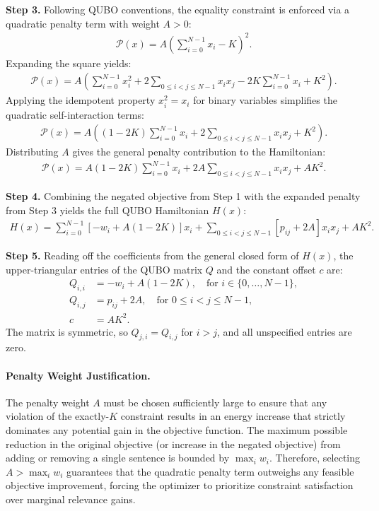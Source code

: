 \documentclass[12pt]{article}
\begin{document}
\textbf{Step 3.} Following QUBO conventions, the equality constraint is enforced via a quadratic penalty term with weight $A > 0$:
\begin{align}
    \mathcal{P}(x) = A \left( \sum_{i=0}^{N-1} x_i - K \right)^2.
\end{align}
Expanding the square yields:
\begin{align}
    \mathcal{P}(x) = A \left( \sum_{i=0}^{N-1} x_i^2 + 2 \sum_{0 \leq i < j \leq N-1} x_i x_j - 2K \sum_{i=0}^{N-1} x_i + K^2 \right).
\end{align}
Applying the idempotent property $x_i^2 = x_i$ for binary variables simplifies the quadratic self-interaction terms:
\begin{align}
    \mathcal{P}(x) = A \left( (1 - 2K) \sum_{i=0}^{N-1} x_i + 2 \sum_{0 \leq i < j \leq N-1} x_i x_j + K^2 \right).
\end{align}
Distributing $A$ gives the general penalty contribution to the Hamiltonian:
\begin{align}
    \mathcal{P}(x) = A(1 - 2K) \sum_{i=0}^{N-1} x_i + 2A \sum_{0 \leq i < j \leq N-1} x_i x_j + A K^2.
\end{align}

\textbf{Step 4.} Combining the negated objective from Step 1 with the expanded penalty from Step 3 yields the full QUBO Hamiltonian $H(x)$:
\begin{align}
    H(x) = \sum_{i=0}^{N-1} \left[ -w_i + A(1 - 2K) \right] x_i + \sum_{0 \leq i < j \leq N-1} \left[ p_{ij} + 2A \right] x_i x_j + A K^2.
\end{align}

\textbf{Step 5.} Reading off the coefficients from the general closed form of $H(x)$, the upper-triangular entries of the QUBO matrix $Q$ and the constant offset $c$ are:
\begin{align}
    Q_{i,i} &= -w_i + A(1 - 2K), \quad \text{for } i \in \{0, \dots, N-1\}, \\
    Q_{i,j} &= p_{ij} + 2A, \quad \text{for } 0 \leq i < j \leq N-1, \\
    c &= A K^2.
\end{align}
The matrix is symmetric, so $Q_{j,i} = Q_{i,j}$ for $i > j$, and all unspecified entries are zero.

\paragraph{Penalty Weight Justification.}
The penalty weight $A$ must be chosen sufficiently large to ensure that any violation of the exactly-$K$ constraint results in an energy increase that strictly dominates any potential gain in the objective function. The maximum possible reduction in the original objective (or increase in the negated objective) from adding or removing a single sentence is bounded by $\max_{i} w_i$. Therefore, selecting $A > \max_{i} w_i$ guarantees that the quadratic penalty term outweighs any feasible objective improvement, forcing the optimizer to prioritize constraint satisfaction over marginal relevance gains.
\end{document}
